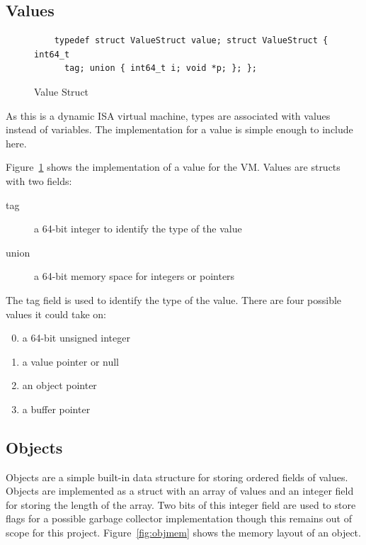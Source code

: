 \documentclass[english,a4paper]{article}
\begin{document}
\subsection{Values}

\begin{figure}
  \begin{lstlisting}
    typedef struct ValueStruct value; struct ValueStruct { int64_t
      tag; union { int64_t i; void *p; }; };
  \end{lstlisting}
  \label{fig:struct}
  \caption{Value Struct}
\end{figure}

As this is a dynamic ISA virtual machine, types are associated with
values instead of variables\cite{RobertoIerusalimschy}. The
implementation for a value is simple enough to include here.

Figure~\ref{fig:struct} shows the implementation of a value for the
VM. Values are structs with two fields:
\begin{description}
\item[tag] a 64-bit integer to identify the type of the value
\item[union] a 64-bit memory space for integers or pointers
\end{description}

The tag field is used to identify the type of the value. There are
four possible values it could take on:
\begin{enumerate}
  \setcounter{enumi}{-1}
\item a 64-bit unsigned integer
\item a value pointer or null
\item an object pointer \setcounter{enumi}{3}
\item a buffer pointer
\end{enumerate}

\subsection{Objects}

Objects are a simple built-in data structure for storing ordered
fields of values. Objects are implemented as a struct with an array of
values and an integer field for storing the length of the array. Two
bits of this integer field are used to store flags for a possible
garbage collector implementation though this remains out of scope for
this project. Figure~\ref{fig:objmem} shows the memory layout of an
object.
\end{document}
